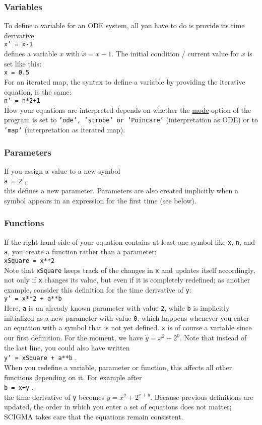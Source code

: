 \documentclass[10pt,a4paper,titlepage]{article}
\newcommand{\HL}[1]{\hyperlink{#1}{#1}}
\newcommand{\T}[1]{\texttt{#1}}
\begin{document}
\subsubsection*{Variables}
To define a variable for an ODE system, all you have to do is provide its time derivative.\\
\T{x' = x-1}\\
defines a variable $x$ with $\dot{x}=x-1$. The initial condition / current value for $x$ is set like this:\\
\T{x = 0.5}\\
For an iterated map, the syntax to define a variable by providing the iterative equation, is the same:\\
\T{n' = n*2+1}\\
How your equations are interpreted depends on whether the \HL{mode} option of the program is set to \T{'ode', 'strobe' or 'Poincare'} (interpretation as ODE) or to \T{'map'} 
(interpretation as iterated map).
\subsubsection*{Parameters}
If you assign a value to a new symbol\\ 
\T{a = 2} ,\\
this defines a new parameter. Parameters are also created implicitly when a symbol appears in an expression
for the first time (see below).
\subsubsection*{Functions}
If the right hand side of your equation contains at least one symbol like \T{x}, \T{n}, and \T{a}, you create
a function rather than a parameter:\\
\T{xSquare = x**2}\\
Note that \T{xSquare} keeps track of the changes in \T{x} and updates itself accordingly, not only if
\T{x} changes its value, but even if it is completely redefined; as another example, consider this definition
for the time derivative of \T{y}:\\
\T{y' = x**2 + a**b}\\ 
Here, \T{a} is an already known parameter with value \T{2}, while \T{b} is implicitly initialized as a new parameter
with value \T{0}, which happens whenever you enter an equation with a symbol that is not yet defined. \T{x} is of course a variable since our first definition. For the moment, we have $\dot{y}=x^2+2^0$. Note that instead of the last line, you could also have written\\ 
\T{y' = xSquare + a**b} .\\ 
When you redefine a variable, parameter or function, this affects all other functions depending on it. For example after\\
\T{b = x+y} ,\\
the time derivative of \T{y} becomes $\dot{y}= x^2 + 2^{x+y}$. Because previous definitions are updated, the order in which you enter a set of equations does not matter; SCIGMA takes care that the equations remain consistent.\\
\end{document}
